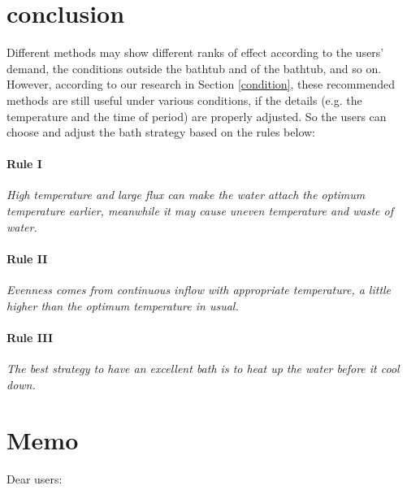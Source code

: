 \documentclass[12pt]{article}
\begin{document}
\section{conclusion}
Different methods may show different ranks of effect according to the users' demand, the conditions
outside the bathtub and of the bathtub, and so on. However, according to our research in Section
\ref{condition}, these recommended methods are still useful under various conditions, if the details
(e.g. the temperature and the time of period) are properly adjusted. So the users can choose and
adjust the bath strategy based on the rules below:

\paragraph{Rule I}
\emph{High temperature and large flux can make the water attach the optimum temperature earlier,
	meanwhile it may cause uneven temperature and waste of water.}
\paragraph{Rule II}
\emph{Evenness comes from continuous inflow with appropriate temperature, a little higher than the
	optimum temperature in usual.}
\paragraph{Rule III}
\emph{The best strategy to have an excellent bath is to heat up the water before it cool down.}

\clearpage
\section*{Memo}
	\begin{flushleft}
		Dear users:
	\end{flushleft}
	
\end{document}
